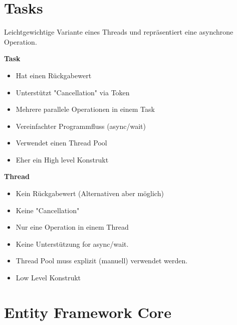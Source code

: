 \section{Tasks}
Leichtgewichtige Variante eines Threads und repräsentiert eine asynchrone Operation. 

\begin{minipage}{0,5\linewidth}
\textbf{Task}  
\begin{itemize}
  \itemsep -0.5em 
  \item Hat einen Rückgabewert
  \item Unterstützt "Cancellation" via Token
  \item Mehrere parallele Operationen in einem Task
  \item Vereinfachter Programmfluss (async/wait)
  \item Verwendet einen Thread Pool
  \item Eher ein High level Konstrukt
\end{itemize}
\end{minipage}
\begin{minipage}{0,5\linewidth}
\textbf{Thread}   
\begin{itemize}
  \itemsep -0.5em 
  \item Kein Rückgabewert (Alternativen aber möglich)
  \item Keine "Cancellation"
  \item Nur eine Operation in einem Thread
  \item Keine Unterstützung for async/wait.
  \item Thread Pool muss explizit (manuell) verwendet werden.
  \item Low Level Konstrukt
\end{itemize}

\end{minipage}



\section{Entity Framework Core}
